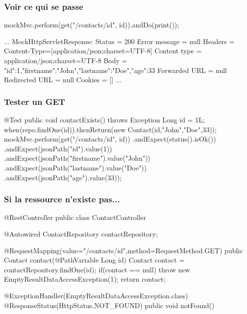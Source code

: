 \begin{frame}[fragile]
 \frametitle{Voir ce qui se passe}

 \begin{javacode}
mockMvc.perform(get("/contacts/{id}", id)).andDo(print());
 \end{javacode}

 \begin{textcode}
...
MockHttpServletResponse:
          Status = 200
  Error message = null
        Headers = {Content-Type=[application/json;charset=UTF-8]}
   Content type = application/json;charset=UTF-8
           Body = {"id":1,"firstname":"John","lastname":"Doe","age":33}
  Forwarded URL = null
 Redirected URL = null
        Cookies = []
...
 \end{textcode}


\end{frame}

\begin{frame}[fragile]
 \frametitle{Tester un GET}

 \begin{javacode}
@Test
public void contactExists() throws Exception {
    Long id = 1L;
    when(repo.findOne(id)).thenReturn(new Contact(id,"John","Doe",33));
    mockMvc.perform(get("/contacts/{id}", id))
         .andExpect(status().isOk())
         .andExpect(jsonPath("id").value(1))
         .andExpect(jsonPath("firstname").value("John"))
         .andExpect(jsonPath("lastname").value("Doe"))
         .andExpect(jsonPath("age").value(33));
}
 \end{javacode}

\end{frame}

\begin{frame}[fragile]
 \frametitle{Si la ressource n'existe pas...}

 \begin{javacode}
@RestController
public class ContactController {

  @Autowired ContactRepository contactRepository;

  @RequestMapping(value="/contacts/{id}",method=RequestMethod.GET)
  public Contact contact(@PathVariable Long id) {
    Contact contact = contactRepository.findOne(id);
    if(contact == null) {
      throw new EmptyResultDataAccessException(1);
    }
    return contact;
  }

  @ExceptionHandler(EmptyResultDataAccessException.class)
  @ResponseStatus(HttpStatus.NOT_FOUND)
  public void notFound() { }

}
 \end{javacode}


\end{frame}

